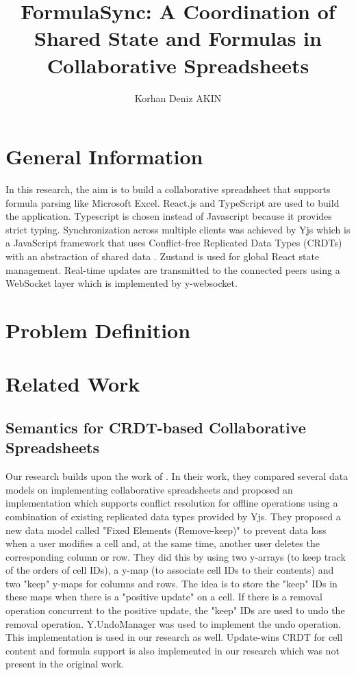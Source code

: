 \documentclass{article}
\title{\textbf{FormulaSync: A Coordination of Shared State and Formulas in Collaborative Spreadsheets}}
\author{Korhan Deniz AKIN}
\date{}
\begin{document}
\maketitle

\tableofcontents
\newpage

\section{General Information}

In this research, the aim is to build a collaborative spreadsheet that supports formula parsing like Microsoft Excel.
React.js and TypeScript are used to build the application. 
Typescript is chosen instead of Javascript because it provides strict typing.
Synchronization across multiple clients was achieved by Yjs
which is a JavaScript framework that uses Conflict-free Replicated Data Types (CRDTs) 
with an abstraction of shared data \cite{yjs}. Zustand is used for global React state management. 
Real-time updates are transmitted to the connected peers using a WebSocket layer which is implemented by y-websocket.

\section{Problem Definition}

\section{Related Work}
\subsection{Semantics for CRDT-based Collaborative Spreadsheets}
Our research builds upon the work of \textcite{yanakieva2023study}. In their work, they compared several data models 
on implementing collaborative spreadsheets and proposed an implementation
which supports conflict resolution for offline operations using a combination of existing replicated data types provided by Yjs. 
They proposed a new data model called "Fixed Elements (Remove-keep)" to prevent data loss when a user modifies a cell and, 
at the same time, another user deletes the corresponding column or row. 
They did this by using two y-arrays (to keep track of the orders of cell IDs), a y-map (to associate cell IDs to their contents) 
and two "keep" y-maps for columns and rows. 
The idea is to store the "keep" IDs in these maps when there is a "positive update" on a cell.
If there is a removal operation concurrent to the positive update, the "keep" IDs are used to undo the removal operation. 
Y.UndoManager was used to implement the undo operation.
This implementation is used in our research as well. 
Update-wins CRDT for cell content and formula support is also implemented in our research which was not present in the original work. 
\end{document}
